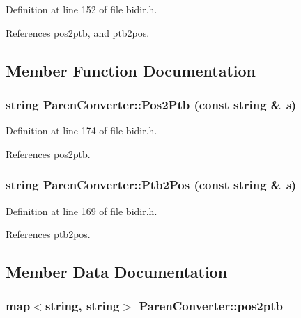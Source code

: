 Definition at line 152 of file bidir.h.

References pos2ptb, and ptb2pos.

\subsection{Member Function Documentation}
\hypertarget{classParenConverter_72070e57f3b3b547be3044aaa6ac1470}{
\subsubsection[{Pos2Ptb}]{\setlength{\rightskip}{0pt plus 5cm}string ParenConverter::Pos2Ptb (const string \& {\em s})}}
\label{classParenConverter_72070e57f3b3b547be3044aaa6ac1470}




Definition at line 174 of file bidir.h.

References pos2ptb.\hypertarget{classParenConverter_0f242c97403167a9113ab8e9e45270d7}{
\subsubsection[{Ptb2Pos}]{\setlength{\rightskip}{0pt plus 5cm}string ParenConverter::Ptb2Pos (const string \& {\em s})}}
\label{classParenConverter_0f242c97403167a9113ab8e9e45270d7}




Definition at line 169 of file bidir.h.

References ptb2pos.

\subsection{Member Data Documentation}
\hypertarget{classParenConverter_d5a82ab3190aec6ad1b2249e68283195}{
\subsubsection[{pos2ptb}]{\setlength{\rightskip}{0pt plus 5cm}map$<$string, string$>$ {\bf ParenConverter::pos2ptb}}}
\label{classParenConverter_d5a82ab3190aec6ad1b2249e68283195}




